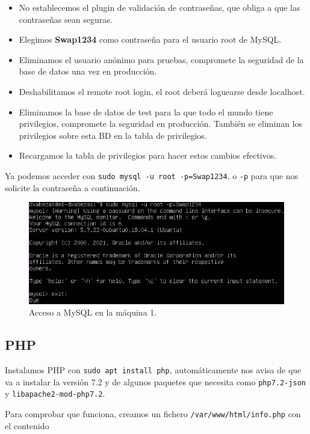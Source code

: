 \documentclass{article}
\begin{document}
\begin{itemize}
	\item No establecemos el plugin de validación de contraseñas, que obliga a que las contraseñas sean seguras.
	\item Elegimos \textbf{Swap1234} como contraseña para el usuario root de MySQL.
	\item Eliminamos el usuario anónimo para pruebas, compromete la seguridad de la base de datos una vez en producción.
	\item Deshabilitamos el remote root login, el root deberá loguearse desde localhost.
	\item Eliminamos la base de datos de test para la que todo el mundo tiene privilegios, compromete la seguridad en producción.
	También se eliminan los privilegios sobre esta BD en la tabla de privilegios.
	\item Recargamos la tabla de privilegios para hacer estos cambios efectivos.
\end{itemize}

Ya podemos acceder con \texttt{sudo mysql -u root -p=Swap1234}, o \texttt{-p} para que nos solicite la contraseña a continuación.

\begin{figure}[H]
	\centering
	\includegraphics[width=160mm]{imgs/mysql}
	\caption{Acceso a MySQL en la máquina 1.}
	\label{fig:mysql}
\end{figure}

\subsection{PHP} \label{sec:php}

Instalamos PHP con \texttt{sudo apt install php}, automáticamente nos avisa de que va a instalar la versión 7.2 y de algunos paquetes
que necesita como \texttt{php7.2-json} y \texttt{libapache2-mod-php7.2}.

Para comprobar que funciona, creamos un fichero \texttt{/var/www/html/info.php} con el contenido
\end{document}
